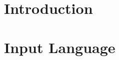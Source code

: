 \documentclass{report}[10pt]
\begin{document}
\sloppypar




\tableofcontents

\chapter{Introduction}
\label{Introduction}

\chapter{Input Language}
\label{Input Language}






\newpage

\cleardoublepage

\printindex[com]
\printindex[var]
\printindex
\end{document}
